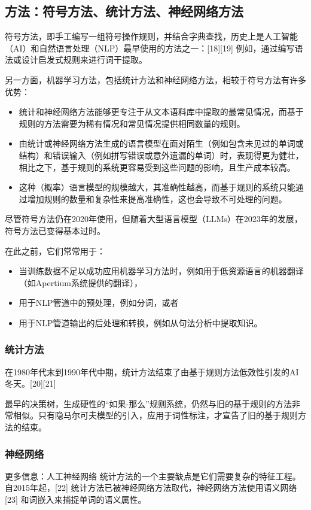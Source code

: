 \subsection{方法：符号方法、统计方法、神经网络方法}  
符号方法，即手工编写一组符号操作规则，并结合字典查找，历史上是人工智能（AI）和自然语言处理（NLP）最早使用的方法之一：[18][19] 例如，通过编写语法或设计启发式规则来进行词干提取。

另一方面，机器学习方法，包括统计方法和神经网络方法，相较于符号方法有许多优势：
\begin{itemize}
\item 统计和神经网络方法能够更专注于从文本语料库中提取的最常见情况，而基于规则的方法需要为稀有情况和常见情况提供相同数量的规则。
\item 由统计或神经网络方法生成的语言模型在面对陌生（例如包含未见过的单词或结构）和错误输入（例如拼写错误或意外遗漏的单词）时，表现得更为健壮，相比之下，基于规则的系统更容易受到这些问题的影响，且生产成本较高。
\item 这种（概率）语言模型的规模越大，其准确性越高，而基于规则的系统只能通过增加规则的数量和复杂性来提高准确性，这也会导致不可处理的问题。
\end{itemize}
尽管符号方法仍在2020年使用，但随着大型语言模型（LLMs）在2023年的发展，符号方法已变得基本过时。

在此之前，它们常常用于：
\begin{itemize}
\item 当训练数据不足以成功应用机器学习方法时，例如用于低资源语言的机器翻译（如Apertium系统提供的翻译），
\item 用于NLP管道中的预处理，例如分词，或者
\item 用于NLP管道输出的后处理和转换，例如从句法分析中提取知识。
\end{itemize}
\subsubsection{统计方法}  
在1980年代末到1990年代中期，统计方法结束了由基于规则方法低效性引发的AI冬天。[20][21]

最早的决策树，生成硬性的“如果-那么”规则系统，仍然与旧的基于规则的方法非常相似。只有隐马尔可夫模型的引入，应用于词性标注，才宣告了旧的基于规则方法的结束。
\subsubsection{神经网络}  
更多信息：人工神经网络  
统计方法的一个主要缺点是它们需要复杂的特征工程。自2015年起，[22] 统计方法已被神经网络方法取代，神经网络方法使用语义网络[23] 和词嵌入来捕捉单词的语义属性。

